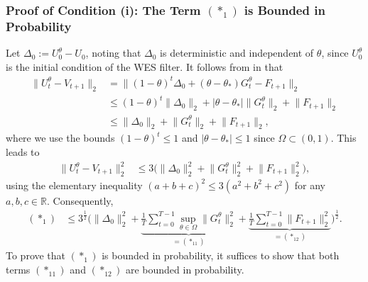 \documentclass[a4paper, 11pt]{article}
\newcommand{\R}{\mathbb{R}}
\theoremstyle{definition}
\begin{document}
\subsubsection{Proof of Condition (i): The Term $(*_1)$ is Bounded in Probability} \label{apx:stochastic_eqcon_1}

Let $\Delta_0 := U_0^\theta - U_0$, noting that $\Delta_0$ is deterministic and independent of $\theta$, since $U_0^\theta$ is the initial condition of the WES filter.
It follows from  in  that
\begin{align}
    \| U_t^{\theta} - V_{t+1} \|_2 & = \| (1 - \theta)^t \Delta_0 + (\theta - \theta_*) G_t^\theta - F_{t+1} \big\|_2 \\
    & \le (1 - \theta)^t \big\| \Delta_0 \big\|_2 + \big| \theta - \theta_* \big| \big\| G_t^\theta \big\|_2 + \big\| F_{t+1} \big\|_2 \\
    & \le \big\| \Delta_0 \big\|_2 + \big\| G_t^\theta \big\|_2 + \big\| F_{t+1} \big\|_2 ,
\end{align}
where we use the bounds $(1 - \theta)^t \le 1$ and $| \theta - \theta_* | \le 1$ since $\Omega \subset (0, 1)$.
This leads to
\begin{align}
    \| U_t^{\theta} - V_{t+1} \|_2^2 & \le 3 \Big( \big\| \Delta_0 \big\|_2^2 + \big\| G_t^\theta \big\|_2^2 + \big\| F_{t+1} \big\|_2^2 \Big) ,
\end{align}
using the elementary inequality $(a + b + c)^2 \le 3 ( a^2 + b^2 + c^2 )$ for any $a, b, c \in \R$.
Consequently, 
\begin{align}
    (*_1) & \le 3^{\frac{1}{2}} \bigg( \big\| \Delta_0 \big\|_2^2 + \underbrace{ \frac{1}{T} \sum_{t=0}^{T-1} \sup_{\theta \in \Omega} \big\| G_t^\theta \big\|_2^2 }_{ = (*_{11}) } + \underbrace{ \frac{1}{T} \sum_{t=0}^{T-1} \big\| F_{t+1} \big\|_2^2 }_{ = (*_{12}) } \bigg)^{\frac{1}{2}} .
\end{align}
To prove that $(*_1)$ is bounded in probability, it suffices to show that both terms $(*_{11})$ and $(*_{12})$ are bounded in probability.
\end{document}
